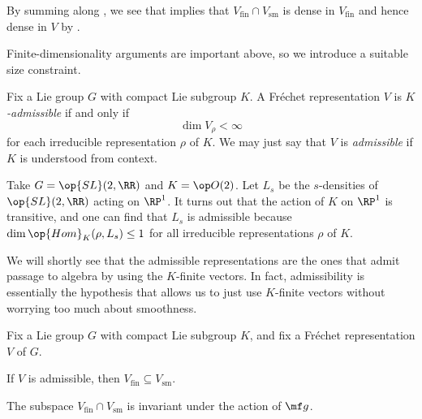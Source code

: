 \documentclass[../notes.tex]{subfiles}
\begin{document}
\begin{remark}
	By summing along , we see that  implies that $V_{\mathrm{fin}}\cap V_{\mathrm{sm}}$ is dense in $V_{\mathrm{fin}}$ and hence dense in $V$ by .
\end{remark}
Finite-dimensionality arguments are important above, so we introduce a suitable size constraint.
\begin{definition}[admissible]
	Fix a Lie group $G$ with compact Lie subgroup $K$. A Fr\'echet representation $V$ is \textit{$K$-admissible} if and only if
	\[\dim V_\rho<\infty\]
	for each irreducible representation $\rho$ of $K$. We may just say that $V$ is \textit{admissible} if $K$ is understood from context.
\end{definition}
\begin{example}
	Take $G=\op{SL}(2,\RR)$ and $K=\op O(2)$. Let $L_s$ be the $s$-densities of $\op{SL}(2,\RR)$ acting on $\RP^1$. It turns out that the action of $K$ on $\RP^1$ is transitive, and one can find that $L_s$ is admissible because $\dim\op{Hom}_K(\rho,L_s)\le1$ for all irreducible representations $\rho$ of $K$.
\end{example}
We will shortly see that the admissible representations are the ones that admit passage to algebra by using the $K$-finite vectors. In fact, admissibility is essentially the hypothesis that allows us to just use $K$-finite vectors without worrying too much about smoothness.
\begin{lemma} \label{lem:get-g-k-module}
	Fix a Lie group $G$ with compact Lie subgroup $K$, and fix a Fr\'echet representation $V$ of $G$.
	\begin{listalph}
		\item If $V$ is admissible, then $V_{\mathrm{fin}}\subseteq V_{\mathrm{sm}}$.
		\item The subspace $V_{\mathrm{fin}}\cap V_{\mathrm{sm}}$ is invariant under the action of $\mf g$.
	\end{listalph}
\end{lemma}
\end{document}
